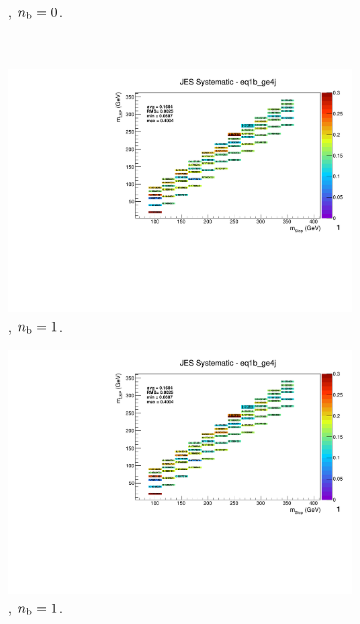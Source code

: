 \begin{figure}[ht!]
\begin{subfigure}[b]{0.32\textwidth}
    \caption{\njhigh, $n_{\text{b}} = 0$.}
    \label{fig:sms-jes-t2cc-ge4j-0b}
  \end{subfigure}\\
  \begin{subfigure}[b]{0.32\textwidth}
    \includegraphics[width=\textwidth, page=12]{Figs/sms/t2cc/v37/systs/T2cc_JES_eq1b_ge4j.pdf}
    \caption{\njhigh, $n_{\text{b}} = 1$.}
  \end{subfigure}
  \begin{subfigure}[b]{0.32\textwidth}
    \includegraphics[width=\textwidth, page=8]{Figs/sms/t2cc/v37/systs/T2cc_JES_eq1b_ge4j.pdf}
    \caption{\njhigh, $n_{\text{b}} = 1$.}
  \end{subfigure}
  \begin{subfigure}[b]{0.32\textwidth}

\end{subfigure}
\end{figure}
